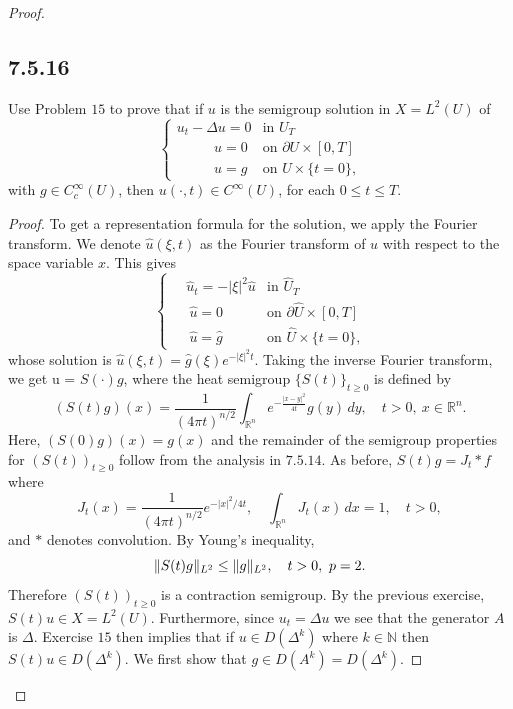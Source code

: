 \documentclass{article}
\DeclarePairedDelimiter{\norm}{\lVert}{\rVert}
\begin{document}
\begin{flushleft}
\begin{proof}
\subsection{\textbf{7.5.16}} Use Problem $15$ to prove that if $u$ is the semigroup solution in $X=L^2(U)$ of
\[
  \begin{cases} 
      u_t-\Delta u=0 & \text{in $U_T$} \\
      ~~~\qquad u = 0 & \text{on $\partial U\times[0,T]$} \\
      ~~~\qquad u = g & \text{on $U\times \{t=0\}$,}
   \end{cases}
\] 
with $g\in C_c^{\infty}(U)$, then $u(\cdot,t)\in C^{\infty}(U)$, for each $0\le t \le T$.

\begin{proof} To get a representation formula for the solution, we apply the Fourier transform. We denote $\hat{u}(\xi,t)$ as the Fourier transform of $u$ with respect to the space variable $x$. This gives
\[
  \begin{cases} 
     \quad \hat{u}_t=-|\xi|^2\hat{u} & \text{in $\hat{U}_T$} \\
     ~\quad \hat{u} = 0 & \text{on $\partial \hat{U}\times[0,T]$} \\
     ~\quad \hat{u} = \hat{g} & \text{on $\hat{U}\times \{t=0\}$,}
   \end{cases}
\] 
whose solution is $\hat{u}(\xi,t)=\hat{g}(\xi)e^{-|\xi|^2t}$. Taking the inverse Fourier transform, we get u = $S(\cdot)g$, where the heat semigroup $\{S(t)\}_{t\ge 0}$ is defined by
$$(S(t)g)(x)=\frac{1}{(4\pi t)^{n/2}}\int_{\mathbb R^n} e^{-\frac{|x-y|^2}{4t}}g(y)\,dy,\quad t>0,~x\in\mathbb R^n.$$
Here, $(S(0)g)(x)=g(x)$ and the remainder of the semigroup properties for $(S(t))_{t\ge 0}$ follow from the analysis in $7.5.14$. As before, $S(t)g = J_t * f$ where
$$J_t(x) = \frac{1}{(4\pi t)^{n/2}} e^{-|x|^2/{4t}},\quad \int_{\mathbb R^n}J_t(x)\,dx=1, \quad t>0,$$
and $*$ denotes convolution. By Young's inequality,
$$\norm{S(t)g}_{L^2}\le \norm{g}_{L^2},\quad t>0, ~ p=2.$$
Therefore $(S(t))_{t\ge 0}$ is a contraction semigroup. By the previous exercise, $S(t)u\in X=L^2(U)$. Furthermore, since $u_t=\Delta u$ we see that the generator $A$ is $\Delta.$ Exercise $15$ then implies that if $u\in D(\Delta^k)$ where $k\in \mathbb N$ then $S(t)u\in D(\Delta^k)$. We first show that $g\in D(A^k)=D(\Delta^k)$.


\end{proof}
\end{proof}
\end{flushleft}
\end{document}
